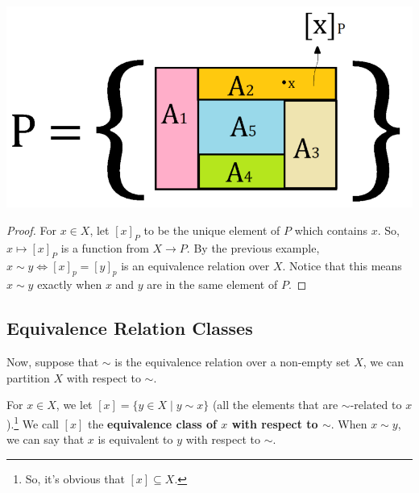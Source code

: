\documentclass[letterpaper]{article}
\begin{document}
\begin{center}
    \includegraphics[scale=0.30]{assets/partition_x.PNG}
\end{center}

\begin{mdframed}
    \begin{proof}
        For $x \in X$, let $[x]_P$ to be the unique element of $P$ which contains $x$. So, $x \mapsto [x]_P$ is a function from $X \to P$. By the previous example, $x \sim y \iff [x]_p = [y]_p$ is an equivalence relation over $X$. Notice that this means $x \sim y$ exactly when $x$ and $y$ are in the same element of $P$. 
    \end{proof}
\end{mdframed}

\subsection{Equivalence Relation Classes}
Now, suppose that $\sim$ is the equivalence relation over a non-empty set $X$, we can partition $X$ with respect to $\sim$. 

\bigskip 

For $x \in X$, we let $[x] = \{y \in X \mid y \sim x\}$ (all the elements that are $\sim$-related to $x$).\footnote{So, it's obvious that $[x] \subseteq X$.} We call $[x]$ the \textbf{equivalence class of $x$ with respect to $\sim$}. When $x \sim y$, we can say that $x$ is equivalent to $y$ with respect to $\sim$. 
\end{document}
